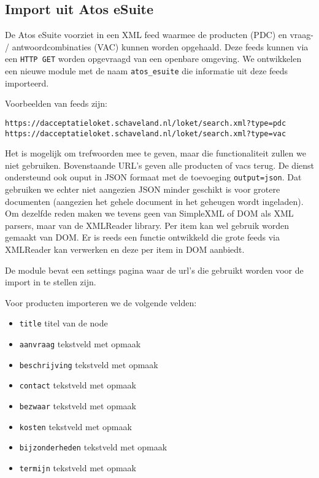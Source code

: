 \subsection{Import uit Atos eSuite}

De Atos eSuite voorziet in een XML feed waarmee de producten (PDC) en vraag- / antwoordcombinaties (VAC) kunnen worden opgehaald. Deze feeds kunnen via een \texttt{HTTP GET} worden opgevraagd van een openbare omgeving.
We ontwikkelen een nieuwe module met de naam \texttt{atos\_esuite} die informatie uit deze feeds importeerd.

Voorbeelden van feeds zijn:
\begin{verbatim}
https://dacceptatieloket.schaveland.nl/loket/search.xml?type=pdc
https://dacceptatieloket.schaveland.nl/loket/search.xml?type=vac
\end{verbatim}
Het is mogelijk om trefwoorden mee te geven, maar die functionaliteit zullen we niet gebruiken. Bovenstaande URL's geven alle producten of vacs terug.
De dienst ondersteund ook ouput in JSON formaat met de toevoeging \texttt{output=json}. Dat gebruiken we echter niet aangezien JSON minder geschikt is voor grotere documenten (aangezien het gehele document in het geheugen wordt ingeladen). Om dezelfde reden maken we tevens geen van SimpleXML of DOM als XML parsers, maar van de XMLReader library. Per item kan wel gebruik worden gemaakt van DOM. Er is reeds een functie ontwikkeld die grote feeds via XMLReader kan verwerken en deze per item in DOM aanbiedt.

De module bevat een settings pagina waar de url's die gebruikt worden voor de import in te stellen zijn.

Voor producten importeren we de volgende velden:
\begin{itemize}
\item \texttt{title} titel van de node
\item \texttt{aanvraag} tekstveld met opmaak
\item \texttt{beschrijving} tekstveld met opmaak
\item \texttt{contact} tekstveld met opmaak
\item \texttt{bezwaar} tekstveld met opmaak
\item \texttt{kosten} tekstveld met opmaak
\item \texttt{bijzonderheden} tekstveld met opmaak
\item \texttt{termijn} tekstveld met opmaak
\end{itemize}

